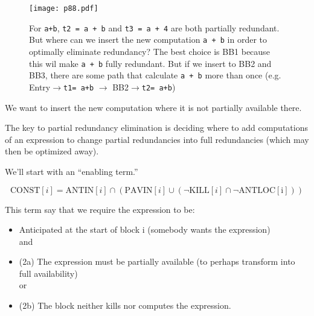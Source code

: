 \begin{figure}[H]
    \centering
     \texttt{[image: p88.pdf]}
         \caption{For \texttt{a+b}, \texttt{t2 = a + b} and \texttt{t3 = a + 4} are both partially redundant. But where can we insert the new computation \texttt{a + b} in order to optimally eliminate redundancy?
         The best choice is BB1 because this wil  make \texttt{a + b} fully redundant. But if we insert to BB2 and BB3, there are some path that calculate \texttt{a + b} more than once (e.g. Entry$\rightarrow$\texttt{t1= a+b} $\rightarrow$ BB2$\rightarrow$\texttt{t2= a+b}) }
         \label{fig:p88}
\end{figure}

We want to insert the new computation where it is not partially available there.


The key to partial redundancy
elimination is deciding where to add
computations of an expression to
change partial redundancies into full
redundancies (which may then be
optimized away).

We’ll start with an “enabling term.”

\[
    \mathrm{CONST}[i] = \mathrm{ANTIN}[i] \cap ( \mathrm{PAVIN}[i] \cup ( \neg \mathrm{KILL}[i] \cap \neg \mathrm{ANTLOC[i]}  ))
\]


This term say that we require the
expression to be:

\begin{itemize}
    \item  Anticipated at the start of block i (somebody wants the expression) \\
    {\huge and} 
    
        \item {\huge (2a)} The expression must be partially
        available (to perhaps transform
        into full availability)\\
        {\huge or} 
        \item {\huge (2b)} The block neither kills nor
        computes the expression.
   
\end{itemize}
